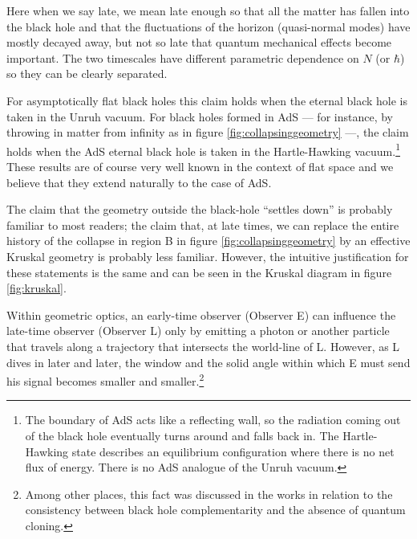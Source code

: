Here when we say late, we mean late enough so that all the matter has fallen into the black hole and that the fluctuations of the horizon (quasi-normal modes) have mostly decayed away, but not so late that quantum mechanical effects become important. The two timescales have different parametric dependence on $N$ (or $\hbar$) so they can be clearly separated.

For asymptotically flat black holes this claim holds when the eternal black hole is taken in the Unruh vacuum. For black holes formed in AdS --- for instance, by throwing in matter from infinity as in figure \ref{fig:collapsinggeometry} ---, the claim holds when the AdS eternal black hole is taken in the Hartle-Hawking vacuum.\footnote{
The boundary of AdS acts like a reflecting wall, so the radiation coming out of the black hole eventually turns around and falls back in. The Hartle-Hawking state describes an equilibrium configuration where there is no net flux of energy. There is no AdS analogue of the Unruh vacuum.} These results are of course very well known in the context of flat space \cite{Unruh:1976db,birrell1984quantum,Hayden:2007cs} and we believe that they extend naturally
to the case of AdS.






The claim that the geometry outside the black-hole ``settles down'' is probably familiar to most readers; the claim that, at late times, we can replace the entire history of the collapse in region B in figure \ref{fig:collapsinggeometry} by an effective Kruskal geometry is probably less familiar. 
However, the intuitive justification for these statements is the same and can be seen in the Kruskal diagram in figure \ref{fig:kruskal}. 

Within geometric optics, an early-time observer (Observer E) can influence the late-time observer (Observer L) only by emitting a photon or another particle that travels along a trajectory that intersects the world-line of L. However, as L dives in later and later, the window and the solid angle within which E must send his signal becomes smaller and smaller.\footnote{Among other places, this fact was discussed in the works \cite{Susskind:1993mu,Hayden:2007cs,Sekino:2008he} in relation to the consistency between black hole complementarity and the absence of quantum cloning.}

